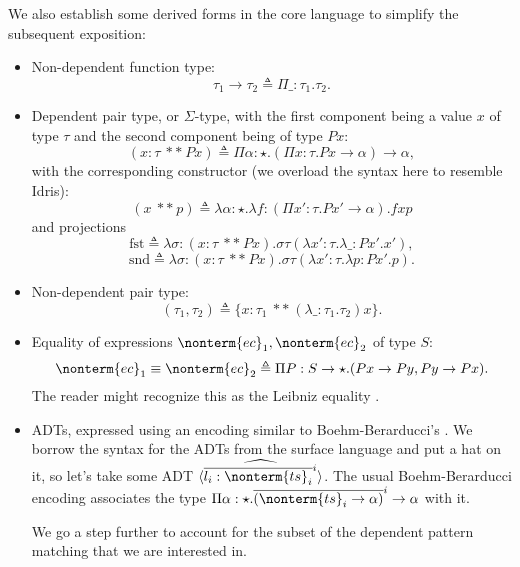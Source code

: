 \documentclass[a4paper]{article}
\begin{document}
\newcommand{\dast}{\ **\ }

We also establish some derived forms in the core language to simplify the subsequent exposition:

\begin{itemize}
  \item Non-dependent function type:
    \[
      \tau_1 \rightarrow \tau_2 \triangleq \Pi \_ : \tau_1. \tau_2.
    \]
  \item Dependent pair type, or $\Sigma$-type, with the first component being a value $x$ of type $\tau$ and the second component being of type $P x$:
    \[
      (x : \tau \dast P x) \triangleq \Pi \alpha : \star. (\Pi x : \tau. P x \rightarrow \alpha) \rightarrow \alpha,
    \]
    with the corresponding constructor (we overload the syntax here to resemble Idris):
    \[
      (x \dast p) \triangleq \lambda \alpha : \star. \lambda f : (\Pi x' : \tau. P x' \rightarrow \alpha). f x p
    \]
    and projections
    \[
      \text{fst} \triangleq \lambda \sigma : (x : \tau \dast P x). \sigma \tau (\lambda x' : \tau. \lambda \_ : P x'. x'),
    \]
    \[
      \text{snd} \triangleq \lambda \sigma : (x : \tau \dast P x). \sigma \tau (\lambda x' : \tau. \lambda p : P x'. p).
    \]
  \item Non-dependent pair type:
    \[
      (\tau_1, \tau_2) \triangleq \{ x : \tau_1\ **\ (\lambda \_ : \tau_1. \tau_2) x \}.
    \]
  \item Equality of expressions $\nonterm{ec}_1, \nonterm{ec}_2$ of type $S$:
    \[
      \nonterm{ec}_1 \equiv \nonterm{ec}_2 \triangleq \Pi P : S \rightarrow \star. (P x \rightarrow P y, P y \rightarrow P x).
    \]
    The reader might recognize this as the Leibniz equality \cite{FindSomethingForThis}.
  \item ADTs, expressed using an encoding similar to Boehm-Berarducci's \cite{Bohm85}.
    We borrow the syntax for the ADTs from the surface language and put a hat on it,
    so let's take some ADT $\widehat{\langle \overline{l_i : \nonterm{ts}_i}^i \rangle}$.
    The usual Boehm-Berarducci encoding associates the type
    $\Pi \alpha : \star. \overline{(\nonterm{ts}_i \rightarrow \alpha)}^i \rightarrow \alpha$ with it.

    We go a step further to account for the subset of the dependent pattern matching
    that we are interested in.


\end{itemize}
\end{document}
